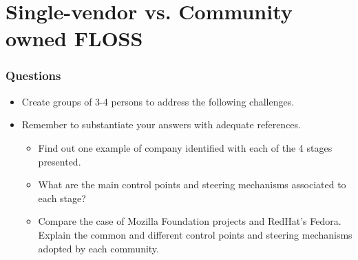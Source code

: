 
\section{Single-vendor vs. Community owned FLOSS}



\begin{frame}
\frametitle{Questions}
\begin{itemize}
  \item Create groups of 3-4 persons to address the following challenges.
  \item Remember to substantiate your answers with adequate references.
  \begin{itemize}
   \item Find out one example of company identified with each of the 4 stages presented.
   \item What are the main control points and steering mechanisms associated to each stage?
   \item Compare the case of Mozilla Foundation projects and RedHat's Fedora. Explain the
common and different control points and steering mechanisms adopted by each community.
  \end{itemize}
\end{itemize}
\end{frame}



